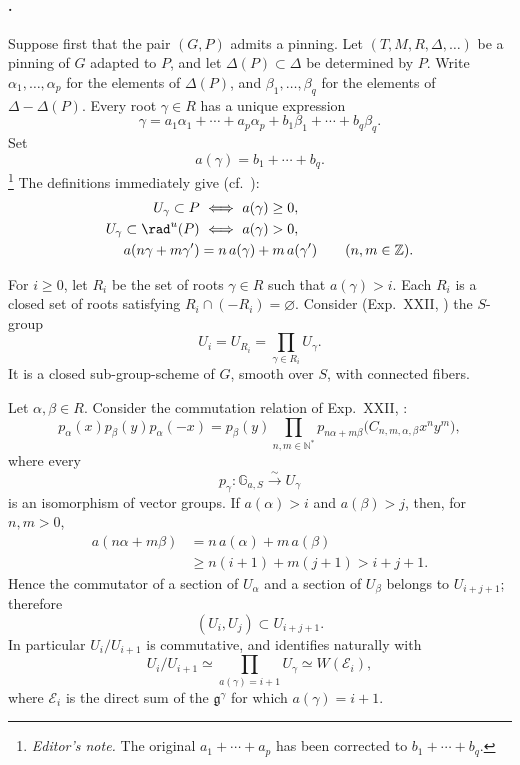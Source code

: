 \paragraph{.}
Suppose first that the pair \((G,P)\) admits a pinning.  Let
\((T,M,R,\Delta,\ldots)\) be a pinning of \(G\) adapted to \(P\), and let
\(\Delta(P)\subset\Delta\) be determined by \(P\).  Write
\(\alpha_1,\ldots,\alpha_p\) for the elements of \(\Delta(P)\), and
\(\beta_1,\ldots,\beta_q\) for the elements of
\(\Delta-\Delta(P)\).  Every root \(\gamma\in R\) has a unique expression
\[
 \gamma
 =a_1\alpha_1+\cdots+a_p\alpha_p
  +b_1\beta_1+\cdots+b_q\beta_q.
\]
Set
\[
 a(\gamma)=b_1+\cdots+b_q.
\tag{7}\label{sga3:xxvi:proposition:2-1:equation:7}
\]
\footnote{\emph{Editor's note.} The original
\(a_1+\cdots+a_p\) has been corrected to \(b_1+\cdots+b_q\).}
The definitions immediately give (cf.\ ):
\[
\begin{aligned}
 U_\gamma\subset P
   &\ \Longleftrightarrow\ a(\gamma)\geq0,\\
 U_\gamma\subset\rad^u(P)
   &\ \Longleftrightarrow\ a(\gamma)>0,\\
 a(n\gamma+m\gamma')
   &=n\,a(\gamma)+m\,a(\gamma')
   \qquad(n,m\in\mathbb Z).
\end{aligned}
\]

For \(i\geq0\), let \(R_i\) be the set of roots \(\gamma\in R\) such that
\(a(\gamma)>i\).  Each \(R_i\) is a closed set of roots satisfying
\(R_i\cap(-R_i)=\varnothing\).  Consider (Exp.\ XXII, ) the
\(S\)-group
\[
 U_i=U_{R_i}=\prod_{\gamma\in R_i}U_\gamma.
\]
It is a closed sub-group-scheme of \(G\), smooth over \(S\), with connected
fibers.

Let \(\alpha,\beta\in R\).  Consider the commutation relation of
Exp.\ XXII, :
\[
 p_\alpha(x)p_\beta(y)p_\alpha(-x)
 =
 p_\beta(y)
 \prod_{n,m\in\mathbb N^*}
 p_{n\alpha+m\beta}
 \bigl(C_{n,m,\alpha,\beta}x^ny^m\bigr),
\]
where every
\[
 p_\gamma:\mathbb G_{a,S}\xrightarrow{\sim}U_\gamma
\]
is an isomorphism of vector groups.  If \(a(\alpha)>i\) and
\(a(\beta)>j\), then, for \(n,m>0\),
\[
\begin{aligned}
 a(n\alpha+m\beta)
 &=n\,a(\alpha)+m\,a(\beta)\\
 &\geq n(i+1)+m(j+1)>i+j+1.
\end{aligned}
\]
Hence the commutator of a section of \(U_\alpha\) and a section of
\(U_\beta\) belongs to \(U_{i+j+1}\); therefore
\[
 (U_i,U_j)\subset U_{i+j+1}.
\]
In particular \(U_i/U_{i+1}\) is commutative, and identifies naturally
with
\[
 U_i/U_{i+1}
 \simeq
 \prod_{a(\gamma)=i+1}U_\gamma
 \simeq W(\mathcal E_i),
\]
where \(\mathcal E_i\) is the direct sum of the
\(\mathfrak g^\gamma\) for which \(a(\gamma)=i+1\).


